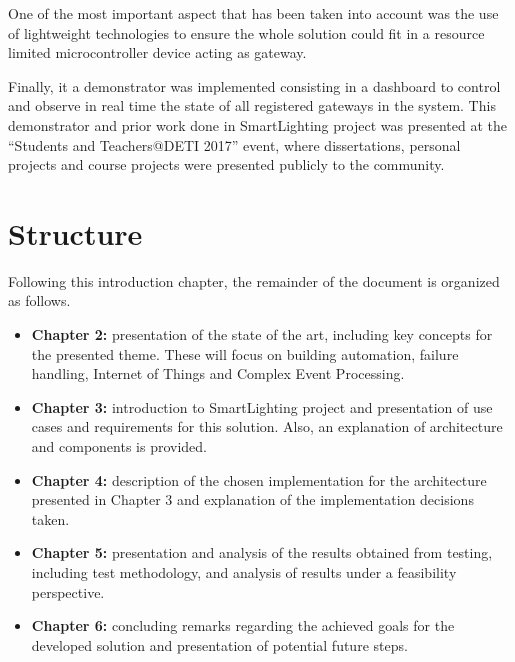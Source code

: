 One of the most important aspect that has been taken into account was the use of lightweight technologies to ensure the whole solution could fit in a resource limited microcontroller device acting as gateway.

Finally, it a demonstrator was implemented consisting in a dashboard to control and observe in real time the state of all registered gateways in the system. This demonstrator and prior work done in SmartLighting project was presented at the ``Students and Teachers@DETI 2017'' event, where dissertations, personal projects and course projects were presented publicly to the community.


\section{Structure}

Following this introduction chapter, the remainder of the document is organized as follows.


\begin{itemize}

	\item{\textbf{Chapter 2:} presentation of the state of the art, including key concepts for the presented theme. These will focus on building automation, failure handling, Internet of Things and Complex Event Processing.}
	\item{\textbf{Chapter 3:} introduction to SmartLighting project and presentation of use cases and requirements for this solution. Also, an explanation of architecture and components is provided.}
	\item{\textbf{Chapter 4:} description of the chosen implementation for the architecture presented in Chapter 3 and explanation of the implementation decisions taken.}
	\item{\textbf{Chapter 5:} presentation and analysis of the results obtained from testing, including test methodology, and analysis of results under a feasibility perspective.}
	\item{\textbf{Chapter 6:} concluding remarks regarding the achieved goals for the developed solution and presentation of potential future steps.}

\end{itemize}